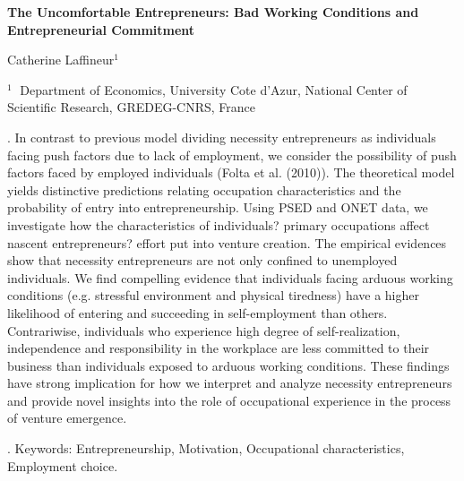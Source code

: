 \documentclass[12pt]{article}
\begin{document}
\begin{flushleft}


{\LARGE\bf The Uncomfortable Entrepreneurs: Bad Working Conditions and Entrepreneurial Commitment}


\vspace{1.0cm}

Catherine Laffineur$^1$ 

\begin{description}

\item $^1 \;$ Department of Economics, University Cote d'Azur, National Center of Scientific Research, GREDEG-CNRS, France


\end{description}

\end{flushleft}


\vspace{0.75cm}

. In contrast to previous model dividing necessity entrepreneurs as individuals facing push factors due to lack of employment, we consider the possibility of push factors faced by employed individuals (Folta et al. (2010)). The theoretical model yields distinctive predictions relating occupation characteristics and the probability of entry into entrepreneurship. Using PSED and ONET data, we investigate how the characteristics of individuals? primary occupations affect nascent entrepreneurs? effort put into venture creation. The empirical evidences show that necessity entrepreneurs are not only confined to unemployed individuals. We find compelling evidence that individuals facing arduous working conditions (e.g. stressful environment and physical tiredness) have a higher likelihood of entering and succeeding in self-employment than others. Contrariwise, individuals who experience high degree of self-realization, independence and responsibility in the workplace are less committed to their business than individuals exposed to arduous working conditions. These findings have strong implication for how we interpret and analyze necessity entrepreneurs and provide novel insights into the role of occupational experience in the process of venture emergence. 

\vskip 2mm

.
Keywords: Entrepreneurship, Motivation, Occupational characteristics, Employment choice.
\end{document}
